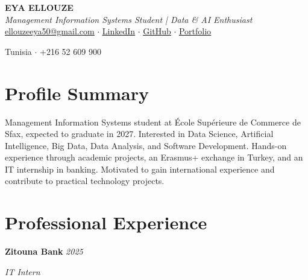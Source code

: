 \documentclass[a4paper,10pt]{article}
\begin{document}
\RaggedRight


\begin{center}

    {\huge \textbf{EYA ELLOUZE}} \\[2pt]

    \normalsize
    \textit{Management Information Systems Student | Data \& AI Enthusiast}
    \\[4pt]

    \small
    \href{mailto:ellouzeeya50@gmail.com}
    {\underline{ellouzeeya50@gmail.com}}
    $\cdot$
    \href{https://www.linkedin.com/in/ellouze-eya-92938a339/}
    {\underline{LinkedIn}}
    $\cdot$
    \href{https://github.com/eya2006}
    {\underline{GitHub}}
    $\cdot$
    \href{https://eya2006.github.io/portfolio-website/}
    {\underline{Portfolio}}


    Tunisia $\cdot$ +216 52 609 900

\end{center}



\section*{Profile Summary}

Management Information Systems student at École Supérieure de Commerce de Sfax, expected to graduate in 2027. Interested in Data Science, Artificial Intelligence, Big Data, Data Analysis, and Software Development. Hands-on experience through academic projects, an Erasmus+ exchange in Turkey, and an IT internship in banking. Motivated to gain international experience and contribute to practical technology projects.



\section*{Professional Experience}

\noindent
\textbf{Zitouna Bank}
\hfill
\textit{2025}


\textit{IT Intern}
\end{document}
